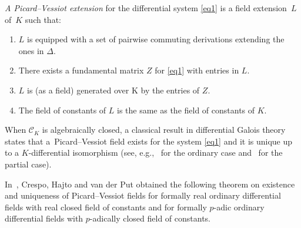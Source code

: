 \documentclass[10pt,a4paper]{amsart}
\numberwithin{equation}{section}
\begin{document}
\begin{Definition}\label{PV}
\emph{A Picard--Vessiot extension} for the differential system \eqref{eq1}
is a field extension~$L$ of~$K$ such that:
\begin{enumerate}\itemsep=0pt
\item[$1.$] $L$ is equipped with a set of pairwise commuting derivations extending the ones in $\Delta$.
\item[$2.$] There exists a fundamental matrix $Z$ for \eqref{eq1} with entries in $L$.
\item[$3.$] $L$ is (as a field) generated over K by the entries of $Z$.
\item[$4.$] The field of constants of $L$ is the same as the field of constants of $K$.
\end{enumerate}
\end{Definition}

When $\mathcal{C}_K$ is algebraically closed, a classical result in differential Galois theory states that a~Picard--Vessiot field exists for the system \eqref{eq1} and it is unique up to a $K$-differential isomorphism (see, e.g.,~\cite[Theorems~5.6.5 and~5.6.9]{CHgsm} for the ordinary case and~\cite[Appendix~D]{PS} for the partial case).

In~\cite{CHP}, Crespo, Hajto and van der Put obtained the following theorem on existence and uniqueness of Picard--Vessiot fields for formally real ordinary differential fields with real closed field of constants and for formally $p$-adic ordinary differential fields with $p$-adically closed field of constants.
\end{document}
